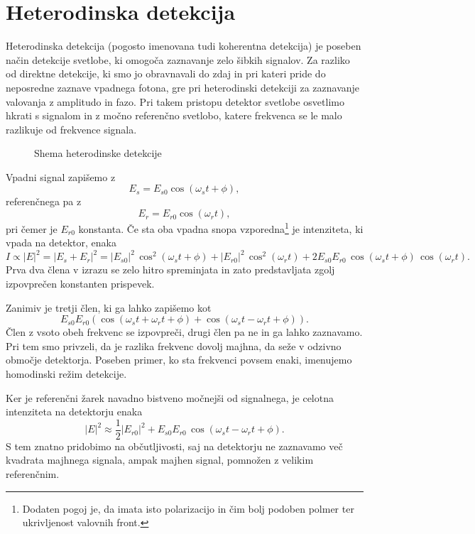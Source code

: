 \section{Heterodinska detekcija}
Heterodinska detekcija (pogosto imenovana tudi koherentna detekcija) je poseben način
detekcije svetlobe, ki omogoča zaznavanje zelo šibkih signalov. Za razliko od direktne detekcije,
ki smo jo obravnavali do zdaj in pri kateri pride do neposredne zaznave vpadnega fotona, 
gre pri heterodinski detekciji za zaznavanje valovanja z amplitudo in fazo. Pri takem 
pristopu detektor svetlobe osvetlimo hkrati s signalom in z močno referenčno svetlobo, 
katere frekvenca se le malo razlikuje od frekvence signala.
\begin{figure}[h]
\centering
\def\svgwidth{80truemm} 

\caption{Shema heterodinske detekcije}
\label{11_Hetero}
\end{figure}

Vpadni signal zapišemo z
\begin{equation}
E_s = E_{s0} \cos(\omega_st+\phi),
\end{equation}
referenčnega pa z
\begin{equation}
E_r = E_{r0} \cos(\omega_rt),
\end{equation}
pri čemer je $E_{r0}$ konstanta. Če sta oba vpadna snopa vzporedna\footnote{Dodaten pogoj je,
da imata isto polarizacijo in čim bolj podoben polmer ter ukrivljenost valovnih front.} je intenziteta, 
ki vpada na detektor, enaka
\begin{equation}
I \propto |E|^2 = |E_s+E_r|^2 = |E_{s0}|^2 \, \cos^2(\omega_st+\phi)+
|E_{r0}|^2 \, \cos^2(\omega_rt) + 2E_{s0}E_{r0}\, \cos(\omega_st+\phi)\, \cos(\omega_rt).
\end{equation}
Prva dva člena v izrazu se zelo hitro spreminjata in zato predstavljata zgolj 
izpovprečen konstanten prispevek. 

Zanimiv je tretji člen, ki ga lahko zapišemo
kot
\begin{equation}
E_{s0}E_{r0}\left( \cos(\omega_st+\omega_rt+\phi)+\cos(\omega_st-\omega_rt+\phi)\right).
\end{equation}
Člen z vsoto obeh frekvenc se izpovpreči, drugi člen pa ne in ga lahko zaznavamo. 
Pri tem smo privzeli, da je razlika frekvenc dovolj majhna, da seže v odzivno območje
detektorja. Poseben primer, ko sta frekvenci povsem enaki, imenujemo homodinski režim 
detekcije. 

Ker je referenčni žarek navadno bistveno močnejši od signalnega, je celotna intenziteta
na detektorju enaka
\begin{equation}
|E|^2 \approx \frac{1}{2}|E_{r0}|^2 + E_{s0}E_{r0}\,\cos(\omega_st-\omega_rt+\phi).
\end{equation}
S tem znatno pridobimo na občutljivosti, saj na detektorju ne zaznavamo več 
kvadrata majhnega signala, ampak majhen signal, pomnožen z velikim referenčnim. 


